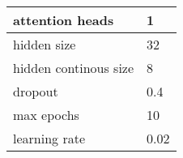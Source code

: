 \begin{tabular}{|p{4cm}|p{1cm}|}
    \hline
    attention heads & 1 \\ \hline
    hidden size & 32 \\ \hline
    hidden continous size & 8 \\ \hline
    dropout & 0.4 \\ \hline
    max epochs & 10 \\ \hline
    learning rate & 0.02 \\ \hline
\end{tabular}
